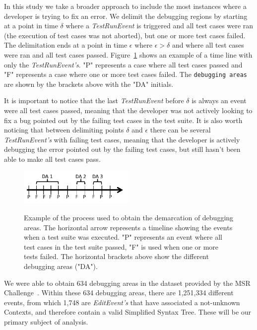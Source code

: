 \documentclass[sigconf]{acmart}
\begin{document}
In this study we take a broader approach to include the most 
instances where a developer is trying to fix an error.
We delimit the debugging regions by starting at a point
in time $\delta$ where a \textit{TestRunEvent} is triggered and 
all test cases were ran (the execution of test cases
was not aborted), but one or more test cases failed.
The delimitation ends at a point in time $\epsilon $ where $ \epsilon > \delta$ 
and where all test cases were ran and all test cases passed.
Figure~\ref{demarcations} shows an example of a time line
with only the \textit{TestRunEvent's}. "P" represents a case
where all test cases passed and "F" represents a case where one
or more test cases failed. The \texttt{debugging areas} are shown by
the brackets above with the "DA" initials. 


It is important to notice that the last \textit{TestRunEvent} before $\delta$ 
is always an event were all test cases passed, meaning that the
developer was not actively looking to fix a bug pointed out by the
failing test cases in the test suite. It is also worth noticing
that between delimiting points $\delta$ and $\epsilon$ there can be 
several \textit{TestRunEvent's} with failing test cases, meaning
that the developer is actively debugging the error pointed out
by the failing test cases, but still hasn't been able to make
all test cases pass.

\begin{figure}[h]
\caption{Example of the process used to obtain the demarcation of
debugging areas. The horizontal arrow represents a timeline showing
the events when a test suite was executed. "P" 
represents an event where all test cases in the test suite
passed, "F" is used when one or more tests failed. The horizontal brackets
above show the different debugging areas ("DA").}
\centering
\includegraphics[width=0.5\textwidth]{images/demarcations.png}
\label{demarcations}
\end{figure}

We were able to obtain 634 debugging areas in the dataset 
provided by the MSR Challenge~\cite{msr18challenge}.
Within these 634 debugging areas, there are 1,251,334
different events, from which 1,748 are \textit{EditEvent's}
that have associated a not-unknown Contexts, and therefore 
contain a valid Simplified Syntax Tree. These will be 
our primary subject of analysis.
\end{document}
